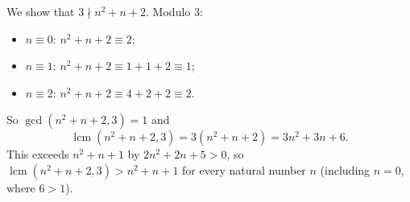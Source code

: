 We show that $3\nmid n^2+n+2$. Modulo $3$:
\begin{itemize}
\item $n\equiv0$: $n^2+n+2\equiv2$;
\item $n\equiv1$: $n^2+n+2\equiv1+1+2\equiv1$;
\item $n\equiv2$: $n^2+n+2\equiv4+2+2\equiv2$.
\end{itemize}
So $\gcd(n^2+n+2,3)=1$ and
\[
\operatorname{lcm}\left(n^2+n+2,3\right)=3\left(n^2+n+2\right)=3n^2+3n+6 .
\]
This exceeds $n^2+n+1$ by $2n^2+2n+5>0$, so $\boxed{\operatorname{lcm}\left(n^2+n+2,3\right)>n^2+n+1}$ for every natural number $n$ (including $n=0$, where $6>1$).
